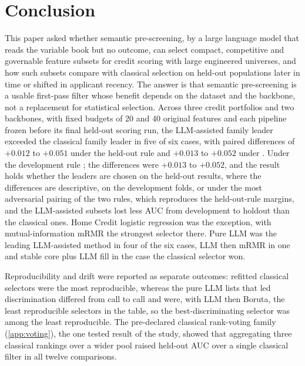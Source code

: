 \documentclass[final,5p,twocolumn]{elsarticle}
\providecommand{\DIFaddtex}[1]{{\protect\color{blue} \sf #1}} %
\providecommand{\DIFdeltex}[1]{{\protect\color{red} \scriptsize #1}} %
\providecommand{\DIFaddbegin}{} %
\providecommand{\DIFaddend}{} %
\providecommand{\DIFdelbegin}{} %
\providecommand{\DIFdelend}{} %
\providecommand{\DIFadd}[1]{\texorpdfstring{\DIFaddtex{#1}}{#1}} %
\providecommand{\DIFdel}[1]{\texorpdfstring{\DIFdeltex{#1}}{}} %
\begin{document}

\section{Conclusion}
\label{sec:conclusion}

This paper asked whether semantic pre-screening, by a large language model that reads the variable book but no outcome, can select compact, competitive and governable feature subsets for credit scoring with large engineered universes, and how such subsets compare with classical selection on held-out populations later in time or shifted in applicant recency. The answer is that semantic pre-screening is a usable first-pass filter whose benefit depends on the dataset and the backbone, not a replacement for statistical selection. Across three credit portfolios and two backbones, with fixed budgets of 20 and 40 original features and each pipeline frozen before its final held-out scoring run, the LLM-assisted family leader exceeded the classical family leader in five of six cases, with paired differences of $+0.012$ to $+0.051$ under the held-out rule\DIFdelbegin \DIFdel{and $+0.013$ to $+0.052$ under }\DIFdelend \DIFaddbegin \DIFadd{. Under }\DIFaddend the development rule \DIFdelbegin \DIFdel{; }\DIFdelend \DIFaddbegin \DIFadd{the differences were $+0.013$ to $+0.052$, and }\DIFaddend the result holds whether the leaders are chosen on the held-out results, where the differences are descriptive, on the development folds, or under the most adversarial pairing of the two rules, which reproduces the held-out-rule margins, and the LLM-assisted subsets lost less AUC from development to holdout than the classical ones. Home Credit logistic regression was the exception, with mutual-information mRMR the strongest selector there. Pure LLM was the leading LLM-assisted method in four of the six cases, LLM then mRMR in one and stable core plus LLM fill in the case the classical selector won.
\DIFaddbegin 

\DIFaddend Reproducibility and drift were reported as separate outcomes: refitted classical selectors were the most reproducible, whereas the pure LLM lists that led discrimination differed from call to call and were, with LLM then Boruta, the least reproducible selectors in the table, so the best-discriminating selector was among the least reproducible. The pre-declared classical rank-voting family (\ref{app:voting}), the one tested result of the study, showed that aggregating three classical rankings over a wider pool raised held-out AUC over a single classical filter in all twelve comparisons.
\end{document}
